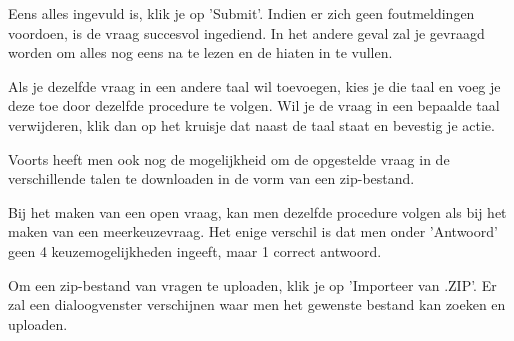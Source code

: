 \documentclass[]{article}
\begin{document}
Eens alles ingevuld is, klik je op 'Submit'. Indien er zich geen foutmeldingen voordoen, is de vraag succesvol ingediend. In het andere geval zal je gevraagd worden om alles nog eens na te lezen en de hiaten in te vullen.

Als je dezelfde vraag in een andere taal wil toevoegen, kies je die taal en voeg je deze toe door dezelfde procedure te volgen. Wil je de vraag in een bepaalde taal verwijderen, klik dan op het kruisje dat naast de taal staat en bevestig je actie. 

Voorts heeft men ook nog de mogelijkheid om de opgestelde vraag in de verschillende talen te downloaden in de vorm van een zip-bestand. 

Bij het maken van een open vraag, kan men dezelfde procedure volgen als bij het maken van een meerkeuzevraag. Het enige verschil is dat men onder 'Antwoord' geen 4 keuzemogelijkheden ingeeft, maar 1 correct antwoord.

Om een zip-bestand van vragen te uploaden, klik je op 'Importeer van .ZIP'. Er zal een dialoogvenster verschijnen waar men het gewenste bestand kan zoeken en uploaden.
\end{document}
